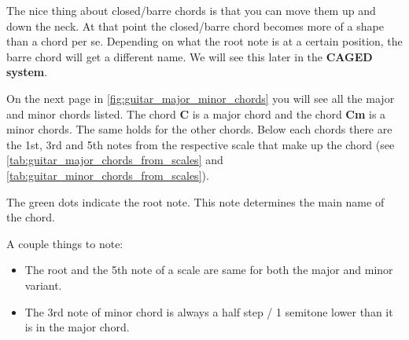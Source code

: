 The nice thing about closed/barre chords is that you can move them up and down the neck. At that point the closed/barre chord becomes more of a shape than a chord per se. Depending on what the root note is at a certain position, the barre chord will get a different name. We will see this later in the \textbf{CAGED system}.

On the next page in \autoref{fig:guitar_major_minor_chords} you will see all the major and minor chords listed. The chord \textbf{C} is a major chord and the chord \textbf{Cm} is a minor chords. The same holds for the other chords. Below each chords there are the 1st, 3rd and 5th notes from the respective scale that make up the chord (see \autoref{tab:guitar_major_chords_from_scales} and \autoref{tab:guitar_minor_chords_from_scales}).

The green dots indicate the root note. This note determines the main name of the chord.

A couple things to note:

\begin{itemize}
	\item The root and the 5th note of a scale are same for both the major and minor variant.
	\item The 3rd note of minor chord is always a half step / 1 semitone lower than it is in the major chord.
\end{itemize}

\newpage




